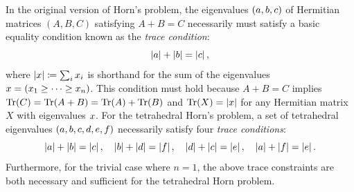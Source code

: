 \documentclass[notitlepage, 10pt]{article}
\begin{document}
\begin{rem}
    In the original version of Horn's problem, the eigenvalues $(a, b, c)$ of Hermitian matrices $(A,B,C)$ satisfying $A+B=C$ necessarily must satisfy a basic equality condition known as the \textit{trace condition}:
    \begin{equation}
        \label{eq:tri_trace_cond}
        \left|a\right|+\left|b\right|=\left|c\right|,
    \end{equation}
    where $\left|x\right| \coloneqq \sum_{i} x_i$ is shorthand for the sum of the eigenvalues $x = (x_1 \geq \cdots \geq x_n)$.
    This condition must hold because $A+B=C$ implies $\operatorname{Tr}(C) = \operatorname{Tr}(A+B) = \operatorname{Tr}(A)+\operatorname{Tr}(B)$ and $\operatorname{Tr}(X) = \left|x\right|$ for any Hermitian matrix $X$ with eigenvalues $x$.
    For the tetrahedral Horn's problem, a set of tetrahedral eigenvalues $(a,b,c,d,e,f)$ necessarily satisfy four \textit{trace conditions}:
    \begin{equation}
        \label{eq:tet_trace_conds}
        \left|a\right| + \left|b\right| = \left|c\right|, \quad
        \left|b\right| + \left|d\right| = \left|f\right|, \quad
        \left|d\right| + \left|c\right| = \left|e\right|, \quad
        \left|a\right| + \left|f\right| = \left|e\right|.
    \end{equation}
    Furthermore, for the trivial case where $n=1$, the above trace constraints are both necessary and sufficient for the tetrahedral Horn problem.
\end{rem}
\end{document}
